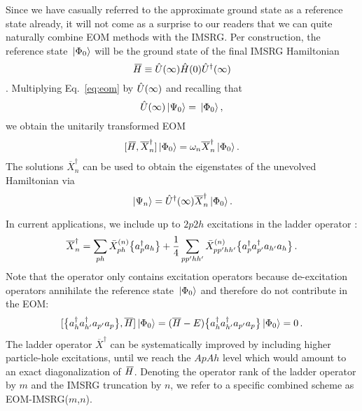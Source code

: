 {Since we have casually referred to the approximate ground state as a 
reference state already, it will not come as a surprise to our readers
that we can quite naturally combine EOM methods with the IMSRG. Per construction,
the reference state $\,|{\Phi_0}\rangle$ will be the ground state of the final IMSRG Hamiltonian 
\begin{equation}
  \mkern 3mu\overline{\mkern-3muH}\equiv\hat{U}(\infty)\hat{H}(0)\hat{U}^\dag(\infty)
\end{equation}. Multiplying Eq.~\ref{eq:eom} by $\hat{U}(\infty)$ and recalling that 
\begin{equation}
  \hat{U}(\infty)\,|{\Psi_0}\rangle = \,|{\Phi_0}\rangle\,,
\end{equation}
we obtain the unitarily transformed EOM
\begin{equation}\label{eq:eom_imsrg}
  \comm{\Hfinal}{\overline{X}^\dag_n}\ket{\Phi_0} = \omega_n \overline{X}^\dag_n\ket{\Phi_0}\,.
\end{equation}
The solutions $\overline{X}^\dag_n$ can be used to obtain the eigenstates 
of the unevolved Hamiltonian via
\begin{equation}
  \,|{\Psi_n}\rangle = \hat{U}^\dag(\infty)\overline{X}^\dag_n\,|{\Phi_0}\rangle\,.
\end{equation}

In current applications, we include up to $2p2h$ excitations in the ladder 
operator \cite{Parzuchowski:2016pi}:
\begin{equation}\label{eq:eom_imsrg_ladder}
  \overline{X}^\dagger_n = \sum_{ph} \bar{X}^{(n)}_{ph} \nord{\aaO_{p}\aO_{h}} + \frac{1}{4}\sum_{pp'hh'} \bar{X}^{(n)}_{pp'hh'} \nord{\aaO_{p}\aaO_{p'}\aO_{h'}\aO_{h}} \,.
\end{equation}
Note that the operator only contains excitation operators because de-excitation 
operators annihilate the reference state $\,|{\Phi_0}\rangle$ and therefore do not 
contribute in the EOM:
\begin{equation}
   [{\big\{a^\dag_{h}a^\dag_{h'}a_{p'}a_{p}\big\}},{\overline{H}}]\,|{\Phi_0}\rangle
   = (\overline{H} - E)\big\{a^\dag_{h}a^\dag_{h'}a_{p'}a_{p}\big\}\,|{\Phi_0}\rangle = 0\,.
\end{equation}
The ladder operator $\overline{X}^\dag$ can be systematically improved by including higher
particle-hole excitations, until we reach the $ApAh$ level which would amount 
to an exact diagonalization of $\mkern 3mu\overline{\mkern-3muH}$. Denoting the operator rank of the 
ladder operator by $m$ and the IMSRG truncation by $n$, we refer to a specific
combined scheme as EOM-IMSRG($m$,$n$). 

}
